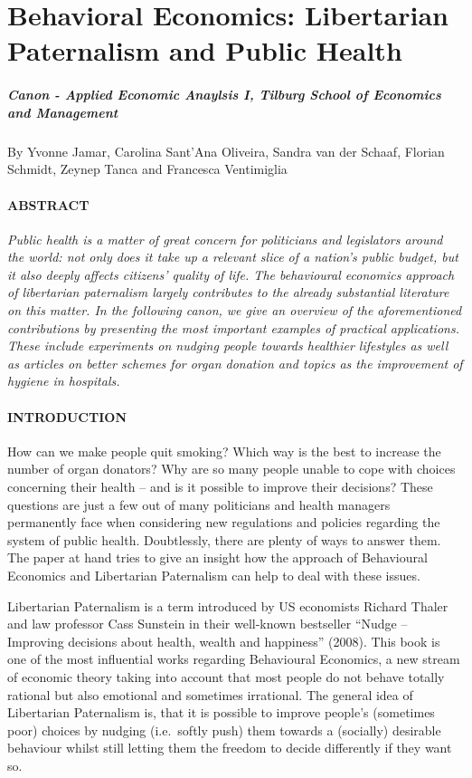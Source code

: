 \documentclass[]{article}
\date{}
\let\oldparagraph\paragraph
\renewcommand{\paragraph}[1]{\oldparagraph{#1}\mbox{}}
\let\oldsubparagraph\subparagraph
\renewcommand{\subparagraph}[1]{\oldsubparagraph{#1}\mbox{}}
\begin{document}
\section{Behavioral Economics: Libertarian Paternalism and Public
Health}\label{behavioral-economics-libertarian-paternalism-and-public-health}

\subparagraph{Canon - Applied Economic Anaylsis I, Tilburg School of
Economics and
Management}\label{canon---applied-economic-anaylsis-i-tilburg-school-of-economics-and-management}

By Yvonne Jamar, Carolina Sant'Ana Oliveira, Sandra van der Schaaf,
Florian Schmidt, Zeynep Tanca and Francesca Ventimiglia

\paragraph{ABSTRACT}\label{abstract}

\emph{Public health is a matter of great concern for politicians and
legislators around the world: not only does it take up a relevant slice
of a nation's public budget, but it also deeply affects citizens'
quality of life. The behavioural economics approach of libertarian
paternalism largely contributes to the already substantial literature on
this matter. In the following canon, we give an overview of the
aforementioned contributions by presenting the most important examples
of practical applications. These include experiments on nudging people
towards healthier lifestyles as well as articles on better schemes for
organ donation and topics as the improvement of hygiene in hospitals.}

\paragraph{INTRODUCTION}\label{introduction}

How can we make people quit smoking? Which way is the best to increase
the number of organ donators? Why are so many people unable to cope with
choices concerning their health -- and is it possible to improve their
decisions? These questions are just a few out of many politicians and
health managers permanently face when considering new regulations and
policies regarding the system of public health. Doubtlessly, there are
plenty of ways to answer them. The paper at hand tries to give an
insight how the approach of Behavioural Economics and Libertarian
Paternalism can help to deal with these issues.

Libertarian Paternalism is a term introduced by US economists Richard
Thaler and law professor Cass Sunstein in their well-known bestseller
``Nudge -- Improving decisions about health, wealth and happiness''
(2008). This book is one of the most influential works regarding
Behavioural Economics, a new stream of economic theory taking into
account that most people do not behave totally rational but also
emotional and sometimes irrational. The general idea of Libertarian
Paternalism is, that it is possible to improve people's (sometimes poor)
choices by nudging (i.e.~softly push) them towards a (socially)
desirable behaviour whilst still letting them the freedom to decide
differently if they want so.
\end{document}

